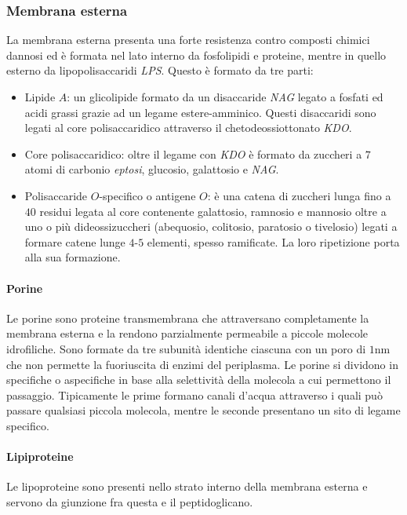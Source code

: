 \subsubsection{Membrana esterna}
La membrana esterna presenta una forte resistenza contro composti chimici dannosi ed \`e formata nel lato interno da fosfolipidi e proteine, mentre in quello esterno da lipopolisaccaridi
\emph{LPS}. Questo \`e formato da tre parti:
\begin{itemize}
	\item Lipide $A$: un glicolipide formato da un disaccaride \emph{NAG} legato a fosfati ed acidi grassi grazie ad un legame estere-amminico. Questi disaccaridi sono legati al core
		polisaccaridico attraverso il chetodeossiottonato \emph{KDO}.
	\item Core polisaccaridico: oltre il legame con \emph{KDO} \`e formato da zuccheri a $7$ atomi di carbonio \emph{eptosi}, glucosio, galattosio e \emph{NAG}.
	\item Polisaccaride $O$-specifico o antigene $O$: \`e una catena di zuccheri lunga fino a $40$ residui legata al core contenente galattosio, ramnosio e mannosio oltre a uno
		o pi\`u dideossizuccheri (abequosio, colitosio, paratosio o tivelosio) legati a formare catene lunge $4$-$5$ elementi, spesso ramificate. La loro ripetizione porta alla
		sua formazione.
\end{itemize}
\paragraph{Porine}
Le porine sono proteine transmembrana che attraversano completamente la membrana esterna e la rendono parzialmente permeabile a piccole molecole idrofiliche. Sono formate da tre
subunit\`a identiche ciascuna con un poro di $1\si{\nano\metre}$ che non permette la fuoriuscita di enzimi del periplasma. Le porine si dividono in specifiche o aspecifiche in base
alla selettivit\`a della molecola a cui permettono il passaggio. Tipicamente le prime formano canali d'acqua attraverso i quali pu\`o passare qualsiasi piccola molecola, mentre le
seconde presentano un sito di legame specifico.
\paragraph{Lipiproteine}
Le lipoproteine sono presenti nello strato interno della membrana esterna e servono da giunzione fra questa e il peptidoglicano.
